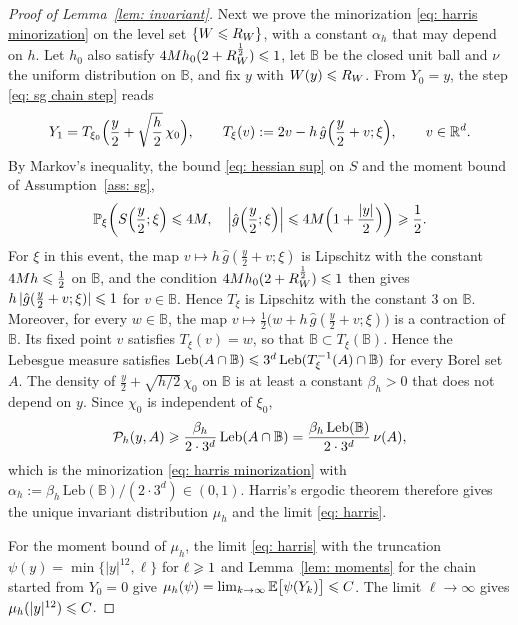 \begin{proof}[Proof of Lemma~\ref{lem: invariant}]
    Next we prove the minorization \eqref{eq: harris minorization} on the level set $\{W \leqslant R_W\}$, with a constant $\alpha_h$ that may depend on $h$. Let $h_0$ also satisfy $4 M h_0 (2 + R_W^{\frac12}) \leqslant 1$, let $\mathbb B$ be the closed unit ball and $\nu$ the uniform distribution on $\mathbb B$, and fix $y$ with $W(y) \leqslant R_W$. From $Y_0 = y$, the step \eqref{eq: sg chain step} reads
    \begin{equation*}
        Y_1 = T_{\xi_0}\Bigl( \frac y2 + \sqrt{\frac h2}\,\chi_0 \Bigr) , \qquad T_\xi(v) := 2v - h\, \hat g\Bigl( \frac y2 + v; \xi \Bigr) , \qquad v \in \mathbb R^d .
    \end{equation*}
    By Markov's inequality, the bound \eqref{eq: hessian sup} on $S$ and the moment bound of Assumption~\ref{ass: sg},
    \begin{equation*}
        \mathbb P_\xi\biggl( S\Bigl( \frac y2;\xi \Bigr) \leqslant 4M , \quad \Bigl| \hat g\Bigl( \frac y2;\xi \Bigr) \Bigr| \leqslant 4M \Bigl( 1 + \frac{|y|}{2} \Bigr) \biggr) \geqslant \frac12 .
    \end{equation*}
    For $\xi$ in this event, the map $v \mapsto h\, \hat g( \frac y2 + v;\xi )$ is Lipschitz with the constant $4 M h \leqslant \frac12$ on $\mathbb B$, and the condition $4 M h_0 (2 + R_W^{\frac12}) \leqslant 1$ then gives $h\, | \hat g( \frac y2 + v;\xi ) | \leqslant 1$ for $v \in \mathbb B$. Hence $T_\xi$ is Lipschitz with the constant $3$ on $\mathbb B$. Moreover, for every $w \in \mathbb B$, the map $v \mapsto \frac12 \bigl( w + h\, \hat g( \frac y2 + v;\xi ) \bigr)$ is a contraction of $\mathbb B$. Its fixed point $v$ satisfies $T_\xi(v) = w$, so that $\mathbb B \subset T_\xi(\mathbb B)$. Hence the Lebesgue measure satisfies $\mathrm{Leb}(A \cap \mathbb B) \leqslant 3^d\, \mathrm{Leb}(T_\xi^{-1}(A) \cap \mathbb B)$ for every Borel set $A$. The density of $\frac y2 + \sqrt{h/2}\,\chi_0$ on $\mathbb B$ is at least a constant $\beta_h > 0$ that does not depend on $y$. Since $\chi_0$ is independent of $\xi_0$,
    \begin{equation*}
        \mathcal P_h(y, A) \geqslant \frac{\beta_h}{2 \cdot 3^d}\, \mathrm{Leb}(A \cap \mathbb B) = \frac{\beta_h\, \mathrm{Leb}(\mathbb B)}{2 \cdot 3^d}\, \nu(A) ,
    \end{equation*}
    which is the minorization \eqref{eq: harris minorization} with $\alpha_h := \beta_h\, \mathrm{Leb}(\mathbb B) / (2 \cdot 3^d) \in (0,1)$. Harris's ergodic theorem therefore gives the unique invariant distribution $\mu_h$ and the limit \eqref{eq: harris}.

    For the moment bound of $\mu_h$, the limit \eqref{eq: harris} with the truncation $\psi(y) = \min\{|y|^{12}, \ell\}$ for $\ell \geqslant 1$ and Lemma~\ref{lem: moments} for the chain started from $Y_0 = 0$ give $\mu_h(\psi) = \lim_{k \to \infty} \mathbb E\bigl[ \psi(Y_k) \bigr] \leqslant C$. The limit $\ell \to \infty$ gives $\mu_h(|y|^{12}) \leqslant C$.


\end{proof}
